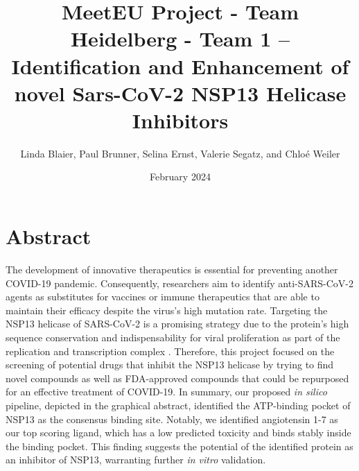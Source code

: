 \documentclass[11pt, letterpaper, titlepage]{article}
\title{MeetEU Project - Team Heidelberg - Team 1 -- \\ Identification and Enhancement of novel Sars-CoV-2 NSP13 Helicase Inhibitors}
\author{Linda Blaier, Paul Brunner, Selina Ernst, Valerie Segatz, and Chlo\'{e} Weiler}
\date{February 2024}
\renewcommand{\cite}{\parencite}
\begin{document}
\maketitle

\ihead{\headmark}
\cfoot{\pagemark}   %



\section{Abstract}

The development of innovative therapeutics is essential for preventing another COVID-19 pandemic. Consequently, researchers aim to identify anti-SARS-CoV-2 agents as substitutes for vaccines or immune therapeutics that are able to maintain their efficacy despite the virus's high mutation rate. Targeting the NSP13 helicase of SARS-CoV-2 is a promising strategy due to the protein's high sequence conservation and indispensability for viral proliferation as part of the replication and transcription complex \cite{Marecki,Malone_2022}. Therefore, this project focused on the screening of potential drugs that inhibit the NSP13 helicase by trying to find novel compounds as well as FDA-approved compounds that could be repurposed for an effective treatment of COVID-19. In summary, our proposed \textit{in silico} pipeline, depicted in the graphical abstract, identified the ATP-binding pocket of NSP13 as the consensus binding site. Notably, we identified angiotensin 1-7 as our top scoring ligand, which has a low predicted toxicity and binds stably inside the binding pocket. This finding suggests the potential of the identified protein as an inhibitor of NSP13, warranting further \textit{in vitro} validation.
\FloatBarrier
\end{document}
